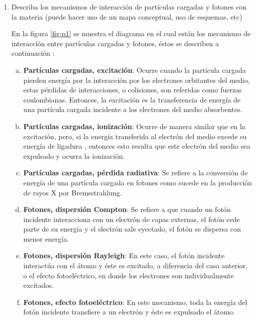 \newlength{\strutheight}
\settoheight{\strutheight}{\strut}


\begin{enumerate}[1.]
\item Describa los mecanismos de interacción de partículas cargadas y fotones con la materia (puede hacer uso de un mapa conceptual, uso de esquemas, etc) 







En la figura \ref{fig:p1} se muestra el diagrama en el cual están los mecanismo de interacción entre partículas cargadas y fotones, éstos se describen a continuación \citep{bush}:
\begin{enumerate}[(a)]
  \item \textbf{Partículas cargadas, excitación}: Ocurre cuando la partícula cargada pierden energía por la interacción por los electrones orbitantes del medio, estas pérdidas de interacciones, o colisiones, son referidas como fuerzas coulombianas. Entonces, la excitación es la transferencia de energía de una partícula cargada incidente a los electrones del medio absorbentes. 
  \item \textbf{Partículas cargadas, ionización}: Ocurre de manera similar que en la excitación, pero, si la energía transferida al electrón del medio excede su energía de ligadura , entonces esto resulta que este electrón del medio sea expulsado y ocurra la ionización.
  \item \textbf{Partículas cargadas, pérdida radiativa}: Se refiere a la conversión de energía de una partícula cargada en fotones como sucede en la producción de rayos X por Bremsstrahlung.
  \item \textbf{Fotones, dispersión Compton}: Se refiere a que cuando un fotón incidente interacciona con un electrón de capas externas, el fotón cede parte de su energía y el electrón sale eyectado, el fotón se dispersa con menor energía.
  \item \textbf{Fotones, dispersión Rayleigh}: En este caso, el fotón incidente interactúa con el átomo y éste es excitado, a diferencia del caso anterior, o el efecto fotoeléctrico, en   donde los electrones son individualmente excitados.
  \item   \textbf{Fotones, efecto fotoeléctrico}: En este mecanismo, toda la energía del fotón incidente transfiere a un electrón y éste es expulsado el átomo. 
\end{enumerate}












\end{enumerate}
